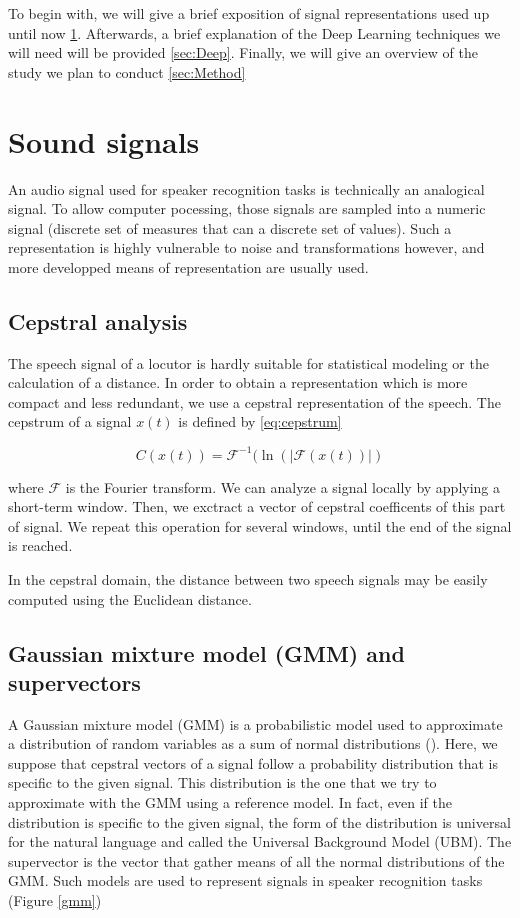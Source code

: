 \documentclass[conference]{IEEEtran}
\begin{document}
To begin with, we will give a brief exposition of signal representations used
up until now \ref{sec:signal}. Afterwards, a brief explanation of the Deep
Learning techniques we will need will be provided \ref{sec:Deep}. Finally, we
will give an overview of the study we plan to conduct \ref{sec:Method}

\section{Sound signals}
\label{sec:signal}
An audio signal used for speaker recognition tasks is technically an analogical
signal. To allow computer pocessing, those signals are sampled into a numeric
signal (discrete set of measures that can a discrete set of values). Such a
representation is highly vulnerable to noise and transformations however,
and more developped means of representation are usually used.

\subsection{Cepstral analysis}

The speech signal of a locutor is hardly suitable for statistical modeling or
the calculation of a distance.
In order to obtain a representation which is more compact and less redundant, we
use a cepstral representation of the speech. 
The cepstrum of a signal $x(t)$ is defined by \eqref{eq:cepstrum}

\begin{equation}
  C(x(t)) = \mathcal{F}^{-1}(\ln(|\mathcal{F}(x(t))|)
   \label{eq:cepstrum}
\end{equation}

where $\mathcal{F}$ is the Fourier transform.
We can analyze a signal locally by applying a short-term window. Then, we 
exctract a vector of cepstral coefficents of this part of signal. We repeat 
this operation for several windows, until the end of the signal is reached. 

In the cepstral domain, the distance between two speech signals may be easily
computed using the Euclidean distance. 


\subsection{Gaussian mixture model (GMM) and supervectors}

A Gaussian mixture model (GMM) is a probabilistic model used to approximate a 
distribution of random variables as a sum of normal distributions (\cite{Bimbot2004}). 
Here, we suppose that cepstral vectors of a signal follow a probability
distribution that is specific to the given signal. This distribution is the one
that we try to approximate with the GMM using a reference model. In fact, even 
if the distribution is specific to the given signal, the form of the 
distribution is universal for the natural language and called the Universal 
Background Model (UBM). The supervector is the vector that gather means of 
all the normal distributions of the GMM. Such models are used to represent
signals in speaker recognition tasks (Figure \ref{gmm})\\
\end{document}
